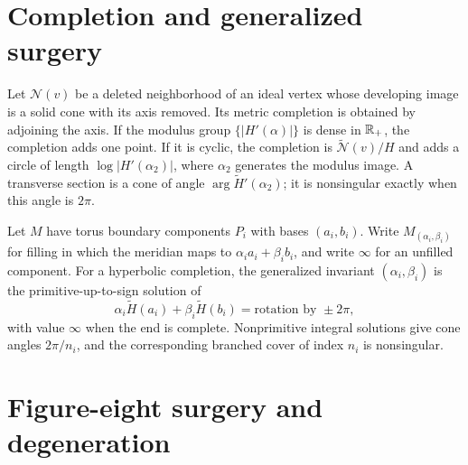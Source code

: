 \section{Completion and generalized surgery}

\begin{proposition}
\label{thurston-ch04-ideal-vertex-completion}
Let \(\mathcal N(v)\) be a deleted neighborhood of an ideal vertex whose developing image is a solid cone with its axis removed. Its metric completion is obtained by adjoining the axis. If the modulus group \(\{|H'(\alpha)|\}\) is dense in \(\mathbb{R}_+\), the completion adds one point. If it is cyclic, the completion is \(\widetilde{\mathcal N}(v)/H\) and adds a circle of length \(\log|H'(\alpha_2)|\), where \(\alpha_2\) generates the modulus image. A transverse section is a cone of angle \(\arg\widetilde H'(\alpha_2)\); it is nonsingular exactly when this angle is \(2\pi\).

\end{proposition}

\begin{definition}
\label{thurston-ch04-generalized-surgery-invariant}
Let \(M\) have torus boundary components \(P_i\) with bases \((a_i,b_i)\). Write \(M_{(\alpha_i,\beta_i)}\) for filling in which the meridian maps to \(\alpha_i a_i+\beta_i b_i\), and write \(\infty\) for an unfilled component. For a hyperbolic completion, the generalized invariant \((\alpha_i,\beta_i)\) is the primitive-up-to-sign solution of
\[
 \alpha_i\widetilde H(a_i)+\beta_i\widetilde H(b_i)=\text{rotation by }\pm2\pi,
\]
with value \(\infty\) when the end is complete. Nonprimitive integral solutions give cone angles \(2\pi/n_i\), and the corresponding branched cover of index \(n_i\) is nonsingular.

\end{definition}

\section{Figure-eight surgery and degeneration}

